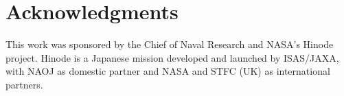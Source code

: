 
\chapter{Acknowledgments}

This work was sponsored by the Chief of Naval Research and NASA's Hinode
project. Hinode is a Japanese mission developed and launched by ISAS/JAXA, with NAOJ as domestic
partner and NASA and STFC (UK) as international partners.

